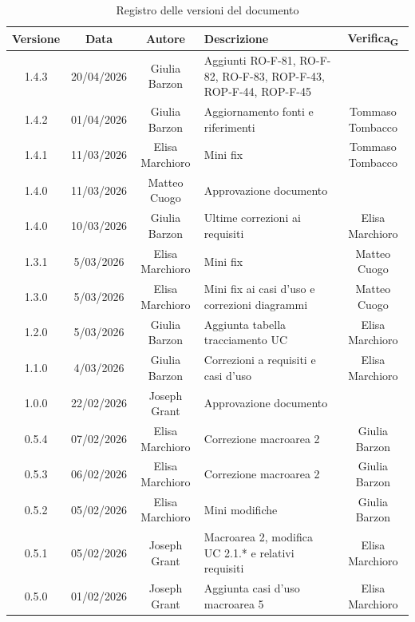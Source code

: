 \documentclass[11pt,a4paper]{article}
\newcommand{\gls}[1]{#1\textsubscript{G}}
\begin{document}
\begin{longtable}[H]{|c|c|c|>{\raggedright\arraybackslash}p{}|c|}
    \caption{Registro delle versioni del documento}
    \label{tab:versionamento} \\
        \hline
        \textbf{Versione} & \textbf{Data} & \textbf{Autore} & \textbf{Descrizione} & \textbf{\gls{Verifica}} \\
        \hline
        1.4.3 & 20/04/2026 & Giulia Barzon & Aggiunti RO-F-81, RO-F-82, RO-F-83, ROP-F-43, ROP-F-44, ROP-F-45 & \\
        \hline
        1.4.2 & 01/04/2026 & Giulia Barzon & Aggiornamento fonti e riferimenti & Tommaso Tombacco \\
        \hline
        1.4.1 & 11/03/2026 & Elisa Marchioro & Mini fix & Tommaso Tombacco \\
        \hline
        1.4.0 & 11/03/2026 & Matteo Cuogo & Approvazione documento & \\
        \hline
        1.4.0 & 10/03/2026 & Giulia Barzon & Ultime correzioni ai requisiti & Elisa Marchioro \\
        \hline
        1.3.1 & 5/03/2026 & Elisa Marchioro & Mini fix & Matteo Cuogo\\
        \hline
        1.3.0 & 5/03/2026 & Elisa Marchioro & Mini fix ai casi d'uso e correzioni diagrammi & Matteo Cuogo\\
        \hline
        1.2.0 & 5/03/2026 & Giulia Barzon & Aggiunta tabella tracciamento UC & Elisa Marchioro\\
        \hline
        1.1.0 & 4/03/2026 & Giulia Barzon & Correzioni a requisiti e casi d'uso & Elisa Marchioro\\
        \hline
        1.0.0 & 22/02/2026 & Joseph Grant & Approvazione documento & \\
        \hline
        0.5.4 & 07/02/2026 & Elisa Marchioro & Correzione macroarea 2 & Giulia Barzon\\
        \hline
        0.5.3 & 06/02/2026 & Elisa Marchioro & Correzione macroarea 2 & Giulia Barzon\\
        \hline
        0.5.2 & 05/02/2026 & Elisa Marchioro & Mini modifiche & Giulia Barzon\\
        \hline
        0.5.1 & 05/02/2026 & Joseph Grant & Macroarea 2, modifica UC 2.1.* e relativi requisiti & Elisa Marchioro\\
        \hline
        0.5.0 & 01/02/2026 & Joseph Grant & Aggiunta casi d'uso macroarea 5 & Elisa Marchioro\\

\end{longtable}
\end{document}
